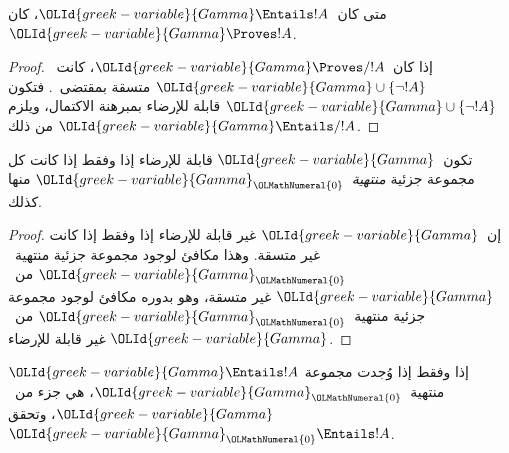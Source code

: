\documentclass[../../../include/open-logic-section]{subfiles}
\begin{document}
\begin{cor}
متى كان~$\OLId{greek-variable}{Gamma}\Entails !A$، كان~$\OLId{greek-variable}{Gamma}\Proves !A$.
\end{cor}

\begin{proof}
إذا كان~$\OLId{greek-variable}{Gamma}\Proves/ !A$، كانت~$\OLId{greek-variable}{Gamma}\cup\{\lnot !A\}$ متسقة
بمقتضى~. فتكون
$\OLId{greek-variable}{Gamma}\cup\{\lnot !A\}$ قابلة للإرضاء بمبرهنة الاكتمال، ويلزم من ذلك
$\OLId{greek-variable}{Gamma}\Entails/ !A$.
\end{proof}

\begin{prop}
تكون~$\OLId{greek-variable}{Gamma}$ قابلة للإرضاء إذا وفقط إذا كانت كل مجموعة جزئية
\emph{منتهية}~$\OLId{greek-variable}{Gamma}_\OLMathNumeral{0}$ منها كذلك.
\end{prop}

\begin{proof}
إن~$\OLId{greek-variable}{Gamma}$ غير قابلة للإرضاء إذا وفقط إذا كانت غير متسقة. وهذا مكافئ
لوجود مجموعة جزئية منتهية~$\OLId{greek-variable}{Gamma}_\OLMathNumeral{0}$ من~$\OLId{greek-variable}{Gamma}$ غير متسقة، وهو بدوره
مكافئ لوجود مجموعة جزئية منتهية~$\OLId{greek-variable}{Gamma}_\OLMathNumeral{0}$ من~$\OLId{greek-variable}{Gamma}$ غير قابلة للإرضاء.
\end{proof}

\begin{cor}
$\OLId{greek-variable}{Gamma}\Entails !A$ إذا وفقط إذا وُجدت مجموعة منتهية~$\OLId{greek-variable}{Gamma}_\OLMathNumeral{0}$، هي جزء
من~$\OLId{greek-variable}{Gamma}$، وتحقق~$\OLId{greek-variable}{Gamma}_\OLMathNumeral{0}\Entails !A$.
\end{cor}
\end{document}
